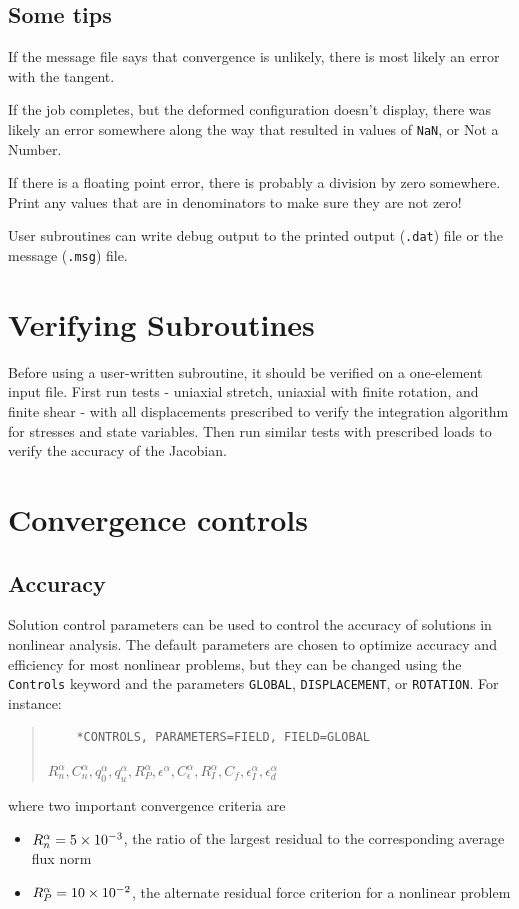 \documentclass[10pt,letterpaper,oneside]{report}
\begin{document}
\subsection{Some tips}
If the message file says that convergence is unlikely, there is most likely an error with the tangent.

If the job completes, but the deformed configuration doesn't display, there was likely an error somewhere along the way that resulted in values of \texttt{NaN}, or Not a Number.  

If there is a floating point error, there is probably a division by zero somewhere.  Print any values that are in denominators to make sure they are not zero!

User subroutines can write debug output to the printed output (\texttt{.dat}) file or the message (\texttt{.msg}) file. 


\section{Verifying Subroutines}
Before using a user-written subroutine, it should be verified on a one-element input file.  First run tests - uniaxial stretch, uniaxial with finite rotation, and finite shear - with all displacements prescribed to verify the integration algorithm for stresses and state variables.  Then run similar tests with prescribed loads to verify the accuracy of the Jacobian.  


\section{Convergence controls}

\subsection{Accuracy}
Solution control parameters can be used to control the accuracy of solutions in nonlinear analysis.  The default parameters are chosen to optimize accuracy and efficiency for most nonlinear problems, but they can be changed using the \texttt{Controls} keyword and the parameters \texttt{GLOBAL}, \texttt{DISPLACEMENT}, or \texttt{ROTATION}.  For instance:
\begin{quote} 
    \begin{lstlisting}
    *CONTROLS, PARAMETERS=FIELD, FIELD=GLOBAL
    \end{lstlisting} 
    $R_n^\alpha, C_n^\alpha, q_0^\alpha, q_u^\alpha, R_P^\alpha, \epsilon^\alpha, C_\epsilon^\alpha, R^\alpha_I, C_f, \epsilon^\alpha_I, \epsilon^\alpha_d$
\end{quote}
where two important convergence criteria are
\begin{itemize}
\item $R_n^\alpha = \num{5E-3}$, the ratio of the largest residual to the corresponding average flux norm
\item $R_P^\alpha = \num{10E-2}$, the alternate residual force criterion for a nonlinear problem
\end{itemize}
\end{document}
